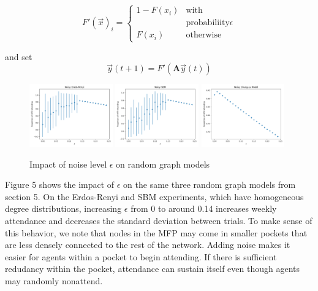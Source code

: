\documentclass[12pt]{article}
\begin{document}
\begin{equation}
  F'(\vec{x})_i = \begin{cases}
    1 - F(x_i) &\text{with} \\
    & \text{probabiliity} \epsilon \\
    F(x_i) &\text{otherwise}
  \end{cases}
\end{equation}

and set
\begin{equation}
  \vec{y}(t + 1) = F'(\mathbf{A}\vec{y}(t))
\end{equation}

\begin{figure}
  \includegraphics[width=0.32\textwidth]{noisy_erdos_renyi.png}
  \includegraphics[width=0.32\textwidth]{noisy_sbm.png}
  \includegraphics[width=0.32\textwidth]{noisy_chung_lu.png}
  \caption{Impact of noise level $\epsilon$ on random graph models}
\end{figure}

Figure 5 shows the impact of $\epsilon$ on the same three random graph models from section 5.  On the Erdos-Renyi and SBM experiments, which have homogeneous degree distributions, increasing $\epsilon$ from 0 to around 0.14 increases weekly attendance and decreases the standard deviation between trials.  To make sense of this behavior, we note that nodes in the MFP may come in smaller pockets that are less densely connected to the rest of the network.  Adding noise makes it easier for agents within a pocket to begin attending.  If there is sufficient redudancy within the pocket, attendance can sustain itself even though agents may randomly nonattend.  
\end{document}
